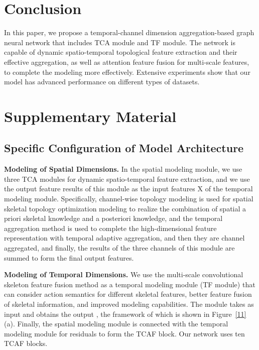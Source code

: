 \documentclass[letterpaper]{article} \usepackage[submission]{aaai23}  \usepackage{times}  \usepackage{helvet}  \usepackage{courier}  \usepackage[hyphens]{url}  \usepackage{graphicx} \urlstyle{rm} \def\UrlFont{\rm}  \usepackage{natbib}  \usepackage{caption} \frenchspacing  \setlength{\pdfpagewidth}{8.5in} \setlength{\pdfpageheight}{11in} \usepackage{algorithm}
\begin{document}
\section{Conclusion}
In this paper, we propose a temporal-channel dimension aggregation-based graph neural network that includes TCA module and TF module. The network is capable of dynamic spatio-temporal topological feature extraction and their effective aggregation, as well as attention feature fusion for multi-scale features, to complete the modeling more effectively. Extensive experiments show that our model has advanced performance on different types of datasets.


\clearpage
\appendix 
\section{Supplementary Material}
\subsection{Specific Configuration of Model Architecture}
{\bf Modeling of Spatial Dimensions.} In the spatial modeling module, we use three TCA modules for dynamic spatio-temporal feature extraction, and we use the output feature results of this module as the input features  X  of the temporal modeling module. Specifically, channel-wise topology modeling is used for spatial skeletal topology optimization modeling to realize the combination of spatial a priori skeletal knowledge and a posteriori knowledge, and the temporal aggregation method is used to complete the high-dimensional feature representation with temporal adaptive aggregation, and then they are channel aggregated, and finally, the results of the three channels of this module are summed to form the final output features. 


\noindent
{\bf Modeling of Temporal Dimensions.} We use the multi-scale convolutional skeleton feature fusion method as a temporal modeling module (TF module) that can consider action semantics for different skeletal features, better feature fusion of skeletal information, and improved modeling capabilities. The module takes  as input and obtains the output , the framework of which is shown in Figure~\ref{11}(a). Finally, the spatial modeling module is connected with the temporal modeling module for residuals to form the TCAF block. Our network uses ten TCAF blocks.
\end{document}
